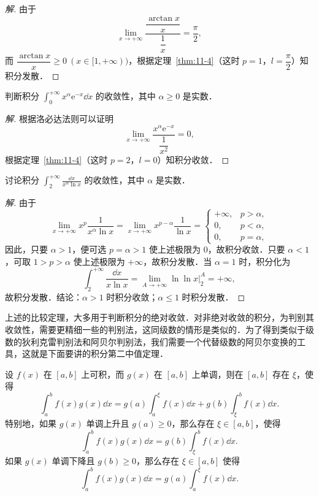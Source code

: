 \begin{proof}[解]
由于
\[
\lim_{x\to+\infty}\frac{\dfrac{\arctan x}{x}}{\dfrac{1}{x}}=\frac{\pi}{2},
\]
而 $\dfrac{\arctan x}{x}\geqslant 0\ (x\in[1,+\infty))$，根据定理~\ref{thm:11-4}（这时 $p=1$，$l=\dfrac{\pi}{2}$）知积分发散．
\end{proof}

\begin{example}\label{ex:11-1-7}
判断积分 $\displaystyle\int_{0}^{+\infty}x^{\alpha}\mathrm{e}^{-x}\dd x$ 的收敛性，其中 $\alpha\geqslant 0$ 是实数．
\end{example}

\begin{proof}[解]
根据洛必达法则可以证明
\[
\lim_{x\to+\infty}\frac{x^{\alpha}\mathrm{e}^{-x}}{\dfrac{1}{x^{2}}}=0,
\]
根据定理~\ref{thm:11-4}（这时 $p=2$，$l=0$）知积分收敛．
\end{proof}

\begin{example}\label{ex:11-1-8}
讨论积分 $\displaystyle\int_{2}^{+\infty}\frac{\dd x}{x^{\alpha}\ln x}$ 的收敛性，其中 $\alpha$ 是实数．
\end{example}

\begin{proof}[解]
由于
\[
\lim_{x\to+\infty}x^{p}\frac{1}{x^{\alpha}\ln x}=\lim_{x\to+\infty}x^{p-\alpha}\frac{1}{\ln x}=\begin{cases}
+\infty, & p>\alpha,\\
0, & p<\alpha,\\
0, & p=\alpha,
\end{cases}
\]
因此，只要 $\alpha>1$，便可选 $p=\alpha>1$ 使上述极限为 $0$，故积分收敛．只要 $\alpha<1$，可取 $1>p>\alpha$ 使上述极限为 $+\infty$，故积分发散．当 $\alpha=1$ 时，积分化为
\[
\int_{2}^{+\infty}\frac{\dd x}{x\ln x}=\lim_{A\to+\infty}\ln\ln x\Big|_{2}^{A}=+\infty,
\]
故积分发散．结论：$\alpha>1$ 时积分收敛；$\alpha\leqslant 1$ 时积分发散．
\end{proof}

上述的比较定理，大多用于判断积分的绝对收敛．对非绝对收敛的积分，为判别其收敛性，需要更精细一些的判别法，这同级数的情形是类似的．为了得到类似于级数的狄利克雷判别法和阿贝尔判别法，我们需要一个代替级数的阿贝尔变换的工具，这就是下面要讲的积分第二中值定理．

\begin{theorem}[积分第二中值定理]\label{thm:11-5}
设 $f(x)$ 在 $[a,b]$ 上可积，而 $g(x)$ 在 $[a,b]$ 上单调，则在 $[a,b]$ 存在 $\xi$，使得
\begin{equation}
\int_{a}^{b}f(x)g(x)\dd x=g(a)\int_{a}^{\xi}f(x)\dd x+g(b)\int_{\xi}^{b}f(x)\dd x.
\tag{1}
\end{equation}
特别地，如果 $g(x)$ 单调上升且 $g(a)\geqslant 0$，那么存在 $\xi\in[a,b]$，使得
\begin{equation}
\int_{a}^{b}f(x)g(x)\dd x=g(b)\int_{\xi}^{b}f(x)\dd x.
\tag{2}
\end{equation}
如果 $g(x)$ 单调下降且 $g(b)\geqslant 0$，那么存在 $\xi\in[a,b]$ 使得
\begin{equation}
\int_{a}^{b}f(x)g(x)\dd x=g(a)\int_{a}^{\xi}f(x)\dd x.
\tag{3}
\end{equation}
\end{theorem}

